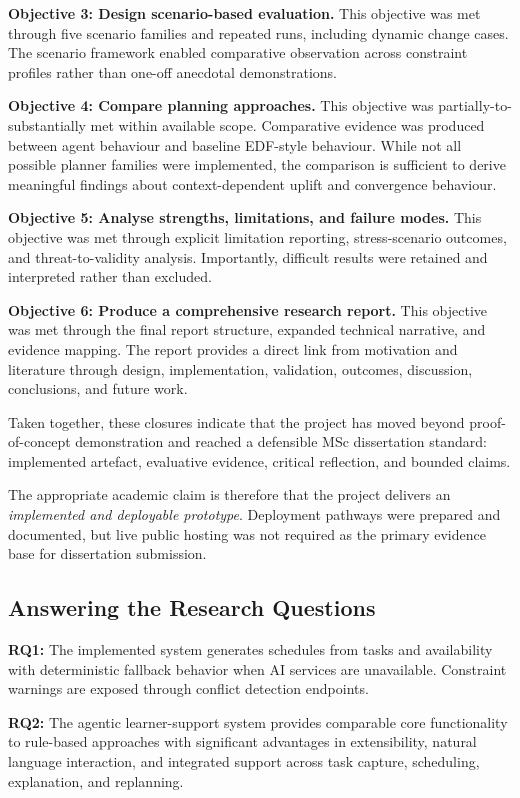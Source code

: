 \documentclass[12pt]{article}
\begin{document}
\textbf{Objective 3: Design scenario-based evaluation.} This objective was met through five scenario families and repeated runs, including dynamic change cases. The scenario framework enabled comparative observation across constraint profiles rather than one-off anecdotal demonstrations.

\textbf{Objective 4: Compare planning approaches.} This objective was partially-to-substantially met within available scope. Comparative evidence was produced between agent behaviour and baseline EDF-style behaviour. While not all possible planner families were implemented, the comparison is sufficient to derive meaningful findings about context-dependent uplift and convergence behaviour.

\textbf{Objective 5: Analyse strengths, limitations, and failure modes.} This objective was met through explicit limitation reporting, stress-scenario outcomes, and threat-to-validity analysis. Importantly, difficult results were retained and interpreted rather than excluded.

\textbf{Objective 6: Produce a comprehensive research report.} This objective was met through the final report structure, expanded technical narrative, and evidence mapping. The report provides a direct link from motivation and literature through design, implementation, validation, outcomes, discussion, conclusions, and future work.

Taken together, these closures indicate that the project has moved beyond proof-of-concept demonstration and reached a defensible MSc dissertation standard: implemented artefact, evaluative evidence, critical reflection, and bounded claims.

The appropriate academic claim is therefore that the project delivers an \textit{implemented and deployable prototype}. Deployment pathways were prepared and documented, but live public hosting was not required as the primary evidence base for dissertation submission.

\subsection{Answering the Research Questions}

\textbf{RQ1:} The implemented system generates schedules from tasks and availability with deterministic fallback behavior when AI services are unavailable. Constraint warnings are exposed through conflict detection endpoints.

\textbf{RQ2:} The agentic learner-support system provides comparable core functionality to rule-based approaches with significant advantages in extensibility, natural language interaction, and integrated support across task capture, scheduling, explanation, and replanning.
\end{document}
